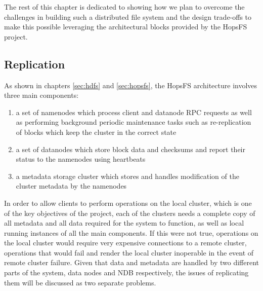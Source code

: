 The rest of this chapter is dedicated to showing how we plan to overcome the challenges in building such a distributed file system and the design trade-offs to make this possible leveraging the architectural blocks provided by the HopsFS project.

\subsection{Replication}
As shown in chapters \ref{sec:hdfs} and \ref{sec:hopsfs}, the HopsFS architecture involves three main components:
\begin{enumerate}
    \item a set of namenodes which process client and datanode RPC requests as well as performing background periodic maintenance tasks such as re-replication of blocks which keep the cluster  in the correct state
    \item a set of datanodes which store block data and checksums and report their status to the namenodes using heartbeats
    \item a metadata storage cluster which stores and handles modification of the cluster metadata by the namenodes
\end{enumerate}
In order to allow clients to perform operations on the local cluster, which is one of the key objectives of the project, each of the clusters needs a complete copy of all metadata and all data required for the system to function, as well as local running instances of all the main components.
If this were not true, operations on the local cluster would require very expensive connections to a remote cluster, operations that would fail and render the local cluster inoperable in the event of remote cluster failure.
Given that data and metadata are handled by two different parts of the system, data nodes and NDB respectively, the issues of replicating them will be discussed as two separate problems.

